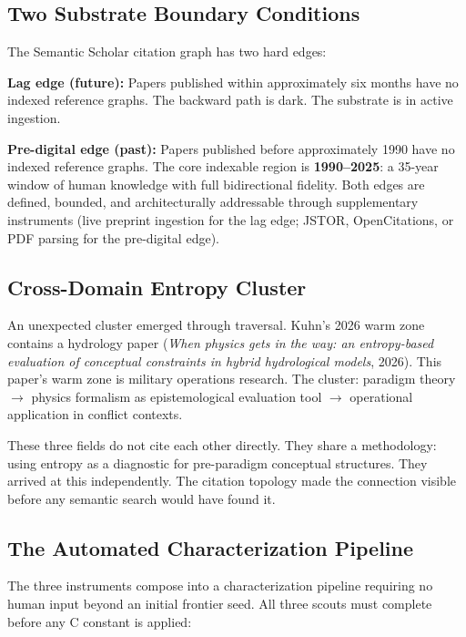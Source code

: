 \documentclass[11pt]{article}
\begin{document}
\subsection{Two Substrate Boundary Conditions}

The Semantic Scholar citation graph has two hard edges:

\textbf{Lag edge (future):} Papers published within approximately six months have no indexed reference graphs. The backward path is dark. The substrate is in active ingestion.

\textbf{Pre-digital edge (past):} Papers published before approximately 1990 have no indexed reference graphs. The core indexable region is \textbf{1990--2025}: a 35-year window of human knowledge with full bidirectional fidelity. Both edges are defined, bounded, and architecturally addressable through supplementary instruments (live preprint ingestion for the lag edge; JSTOR, OpenCitations, or PDF parsing for the pre-digital edge).

\subsection{Cross-Domain Entropy Cluster}

An unexpected cluster emerged through traversal. Kuhn's 2026 warm zone contains a hydrology paper (\textit{When physics gets in the way: an entropy-based evaluation of conceptual constraints in hybrid hydrological models}, 2026). This paper's warm zone is military operations research. The cluster: paradigm theory $\to$ physics formalism as epistemological evaluation tool $\to$ operational application in conflict contexts.

These three fields do not cite each other directly. They share a methodology: using entropy as a diagnostic for pre-paradigm conceptual structures. They arrived at this independently. The citation topology made the connection visible before any semantic search would have found it.

\subsection{The Automated Characterization Pipeline}

The three instruments compose into a characterization pipeline requiring no human input beyond an initial frontier seed. All three scouts must complete before any C constant is applied:
\end{document}
